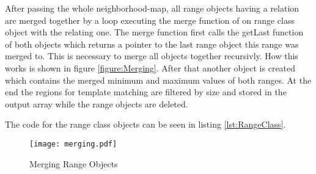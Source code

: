 After passing the whole neighborhood-map, all range objects having a relation are merged together
by a loop executing the merge function of on range class object with the relating one.
The merge function first calls the getLast function of both objects which returns a pointer to the
last range object this range was merged to. This is necessary to merge all objects together recursivly.
How this works is shown in figure \vref{figure:Merging}. After that another object is created which 
contains the merged minimum and maximum values of both ranges. At the end the regions for template matching
are filtered by size and stored in the output array while the range objects are deleted. 

The code for the range class objects can be seen in listing \vref{lst:RangeClass}.

\begin{figure}[htp]
\begin{center}
  \texttt{[image: merging.pdf]}
  \caption{Merging Range Objects}
  \label{figure:Merging}
\end{center}
\end{figure}


